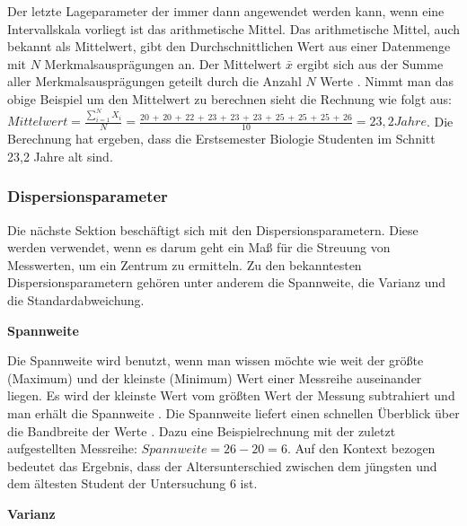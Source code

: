 Der letzte Lageparameter der immer dann angewendet werden kann, wenn eine Intervallskala vorliegt ist das arithmetische Mittel. Das arithmetische Mittel, auch bekannt als Mittelwert, gibt den Durchschnittlichen Wert aus einer Datenmenge mit $N$ Merkmalsausprägungen an. Der Mittelwert $\bar{x}$ ergibt sich aus der Summe aller Merkmalsausprägungen geteilt durch die Anzahl $N$ Werte \citep[vgl.][49\psq]{Fahrmeir2016}. Nimmt man das obige Beispiel um den Mittelwert zu berechnen sieht die Rechnung wie folgt aus: \\
$Mittelwert = \frac{\sum \limits_{i=1}^N X_i}{N} = \frac{20\,+\,20\,+\,22\,+\,23\,+\,23\,+\,23\,+\,25\,+\,25\,+\,25\,+\,26}{10} = 23,2 Jahre$. Die Berechnung hat ergeben, dass die Erstsemester Biologie Studenten im Schnitt 23,2 Jahre alt sind.

\subsubsection{Dispersionsparameter}
Die nächste Sektion beschäftigt sich mit den Dispersionsparametern. Diese werden verwendet, wenn es darum geht ein Maß für die Streuung von Messwerten, um ein Zentrum zu ermitteln. Zu den bekanntesten Dispersionsparametern gehören unter anderem die Spannweite, die Varianz und die Standardabweichung.

\textbf{Spannweite}

Die Spannweite wird benutzt, wenn man wissen möchte wie weit der größte (Maximum) und der kleinste (Minimum) Wert einer Messreihe auseinander liegen. Es wird der kleinste Wert vom größten Wert der Messung subtrahiert und man erhält die Spannweite \citep[vgl.][62]{Fahrmeir2016}. Die Spannweite liefert einen schnellen Überblick über die Bandbreite der Werte \citep[vgl.][38]{Kronthaler2016}. Dazu eine Beispielrechnung mit der zuletzt aufgestellten Messreihe: $Spannweite = 26 - 20 = 6$. Auf den Kontext bezogen bedeutet das Ergebnis, dass der Altersunterschied zwischen dem jüngsten und dem ältesten Student der Untersuchung 6 ist.

\textbf{Varianz}

